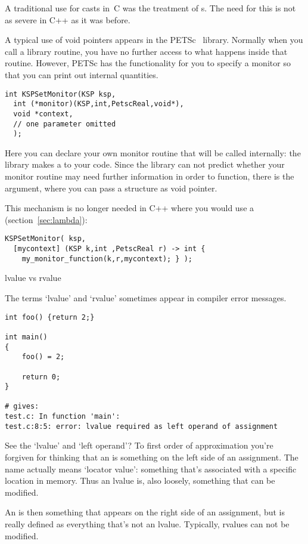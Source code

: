 A traditional use for casts in~C was the treatment of
s. The need for this is not as severe in
C++ as it was before.

A typical use of void pointers appears in the
PETSc~\cite{petsc-efficient,petsc-home-page} library. Normally when
you call a library routine, you have no further access to what happens
inside that routine. However, PETSc has the functionality for you to
specify a monitor so that you can print out internal quantities.
\begin{lstlisting}
int KSPSetMonitor(KSP ksp,
  int (*monitor)(KSP,int,PetscReal,void*),
  void *context,
  // one parameter omitted
  );
\end{lstlisting}
Here you can declare your own monitor routine that will be called
internally: the library makes a  to your code.
Since the library can not predict whether your monitor routine may
need further information in order to function, there is the
 argument, where you can pass a structure as void pointer.

This mechanism is no longer needed in C++ where you would use a
 (section~\ref{sec:lambda}):
\begin{lstlisting}
KSPSetMonitor( ksp,
  [mycontext] (KSP k,int ,PetscReal r) -> int {
    my_monitor_function(k,r,mycontext); } );
\end{lstlisting}


 {lvalue vs rvalue}
\label{sec:lrvalue}

The terms `lvalue' and `rvalue' sometimes appear in compiler error
messages.
\begin{lstlisting}
int foo() {return 2;}

int main()
{
    foo() = 2;

    return 0;
}

# gives:
test.c: In function 'main':
test.c:8:5: error: lvalue required as left operand of assignment
\end{lstlisting}

See the `lvalue' and `left operand'? To first order of approximation
you're forgiven for thinking that an  is something
on the left side of an assignment. The name actually means `locator
value': something that's associated with a specific location in
memory. Thus an lvalue is, also loosely, something that can be modified.

An  is then something that appears on the right
side of an assignment, but is really defined as everything that's not
an lvalue. Typically, rvalues can not be modified.

